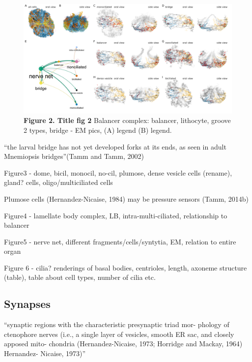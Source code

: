 \documentclass[
  11pt,
]{article}
\begin{document}
\begin{figure}[H]

{\centering \includegraphics[width=1\textwidth,height=\textheight]{figures/Figure_network.png}

}

\caption{\textbf{Figure 2. Title fig 2} Balancer complex: balancer,
lithocyte, groove 2 types, bridge - EM pics, (A) legend (B) legend.}

\end{figure}%

``the larval bridge has not yet developed forks at its ends, as seen in
adult Mnemiopsis bridges''(Tamm and Tamm, 2002)

Figure3 - dome, bicil, monocil, no-cil, plumose, dense vesicle cells
(rename), gland? cells, oligo/multiciliated cells

Plumose cells (Hernandez-Nicaise, 1984) may be pressure sensors (Tamm,
2014b)

Figure4 - lamellate body complex, LB, intra-multi-ciliated, relationship
to balancer

Figure5 - nerve net, different fragments/cells/syntytia, EM, relation to
entire organ

Figure 6 - cilia? renderings of basal bodies, centrioles, length,
axoneme structure (table), table about cell types, number of cilia etc.

\subsection{Synapses}\label{synapses}

``synaptic regions with the characteristic presynaptic triad mor-
phology of ctenophore nerves (i.e., a single layer of vesicles, smooth
ER sac, and closely apposed mito- chondria (Hernandez-Nicaise, 1973;
Horridge and Mackay, 1964) Hernandez- Nicaise, 1973)''
\end{document}
